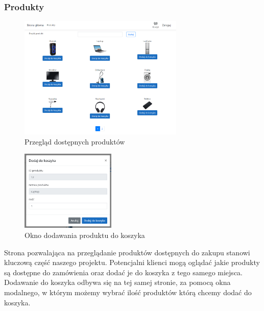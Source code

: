\documentclass{article}
\begin{document}
\subsubsection{Produkty}
\begin{figure}[H]
   \centering
   \includegraphics[width=0.7\textwidth,frame]{Wyglad/produkty.png}
   \caption{Przegląd dostępnych produktów}
\end{figure}
\begin{figure}[h]
   \centering
   \includegraphics[width=0.4\textwidth,frame]{Wyglad/dodaj_koszyk.png}
   \caption{Okno dodawania produktu do koszyka}
\end{figure}
Strona pozwalająca na przeglądanie produktów dostępnych do zakupu stanowi
kluczową część naszego projektu. Potencjalni klienci mogą oglądać jakie produkty
są dostępne do zamówienia oraz dodać je do koszyka z tego samego miejsca.
Dodawanie do koszyka odbywa się na tej samej stronie, za pomocą okna modalnego,
w którym możemy wybrać ilość produktów którą chcemy dodać do koszyka.
\end{document}
